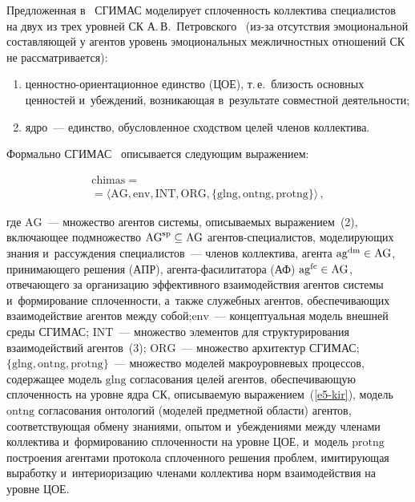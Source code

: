 \begin{multicols}{2}
  Предложенная в~\cite{2-kir} \mbox{СГИМАС} моделирует сплоченность 
коллектива специалистов на двух из трех уровней СК 
А.\,В.~Петровского~\cite{8-kir} (из-за отсутствия эмоциональной 
составляющей у агентов уровень эмоциональных межличностных отношений 
СК не рассматривается):
  \begin{enumerate}[(1)]
  \item ценностно-ори\-ен\-та\-ци\-он\-ное единство (ЦОЕ), т.\,е.\ бли\-зость 
основных ценностей и~убеждений, возникающая в~результате совместной 
деятельности;
  \item  ядро~--- единство, обусловленное сходством целей членов коллектива.
  \end{enumerate}
  
  Формально \mbox{СГИМАС}~\cite{2-kir} описывается сле\-ду\-ющим 
выражением:

\vspace*{-6pt}

\noindent
  \begin{multline}
  \mathrm{chimas}={}\\
  {}=\langle \mathrm{AG}, \mathrm{env}, \mathrm{INT}, 
\mathrm{ORG}, \{ \mathrm{glng}, \mathrm{ontng}, \mathrm{protng}\}\rangle\,,
  \end{multline}
  
  \vspace*{-2pt}
  
  \noindent
где $\mathrm{AG}$~--- множество агентов системы, опи\-сы\-ва\-емых 
выражением~(2), включающее подмножество 
$\mathrm{AG}^{\mathrm{sp}}\hm\subseteq \mathrm{AG}$ 
 аген\-тов-спе\-ци\-а\-лис\-тов, моделирующих знания и~рассуждения 
специалистов~--- членов коллектива, агента 
$\mathrm{ag}^{\mathrm{dm}}\hm\in \mathrm{AG}$, принимающего решения 
(АПР), аген\-та-фа\-си\-ли\-та\-то\-ра (АФ) $\mathrm{ag}^{\mathrm{fc}}\hm\in 
\mathrm{AG}$,\linebreak
 отвечающего за организацию эффективного взаимодействия 
агентов системы и~формирование сплоченности, а~также служебных агентов, 
обеспечивающих взаимодействие агентов между собой;\linebreak $\mathrm{env}$~--- 
концептуальная модель внешней среды \mbox{СГИМАС}; $\mathrm{INT}$~--- 
множество элементов для структурирования взаимодействий агентов~(3); 
$\mathrm{ORG}$~--- множество архитектур \mbox{СГИМАС};\linebreak 
$\{\mathrm{glng}, \mathrm{ontng}, \mathrm{protng}\}$~--- множество моделей 
макроуровневых процессов, содержащее модель $\mathrm{glng}$ согласования 
целей агентов, обеспечивающую сплочен\-ность на уровне ядра СК, 
описываемую выражением~(\ref{e5-kir}), модель $\mathrm{ontng}$ 
согласования онтологий (моделей предметной об\-ласти) агентов, 
соответствующая обмену знаниями, опытом и~убеждениями между членами 
коллектива и~формированию сплоченности на уровне ЦОЕ, и~модель 
$\mathrm{protng}$ построения агентами протокола сплоченного решения 
проблем, имитирующая выработку и~интериоризацию членами коллектива 
норм взаимодействия на уровне ЦОЕ. 
  

\end{multicols}
